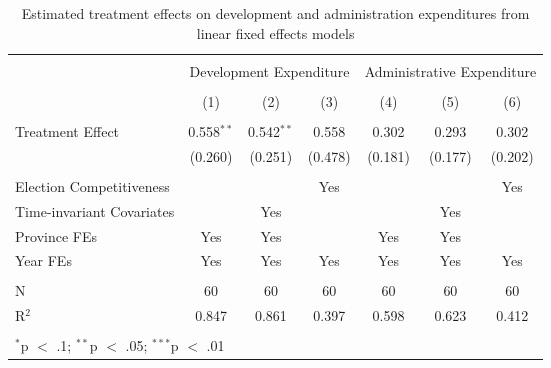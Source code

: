 
\begin{table}[!htbp] \centering 
  \caption{Estimated treatment effects on development and administration expenditures from linear fixed effects models} 
  \label{tab:lfe_mech} 
\begin{tabular}{@{\extracolsep{5pt}}lcccccc} 
\\[-1.8ex]\hline 
\hline \\[-1.8ex] 
 & \multicolumn{3}{c}{Development Expenditure} & \multicolumn{3}{c}{Administrative Expenditure} \\ 
\\[-1.8ex] & (1) & (2) & (3) & (4) & (5) & (6)\\ 
\hline \\[-1.8ex] 
 Treatment Effect & 0.558$^{**}$ & 0.542$^{**}$ & 0.558 & 0.302 & 0.293 & 0.302 \\ 
  & (0.260) & (0.251) & (0.478) & (0.181) & (0.177) & (0.202) \\ 
 \hline \\[-1.8ex] 
Election Competitiveness &  &  & Yes &  &  & Yes \\ 
Time-invariant Covariates &  & Yes &  &  & Yes &  \\ 
Province FEs & Yes & Yes &  & Yes & Yes &  \\ 
Year FEs & Yes & Yes & Yes & Yes & Yes & Yes \\ 
\hline \\[-1.8ex] 
N & 60 & 60 & 60 & 60 & 60 & 60 \\ 
R$^{2}$ & 0.847 & 0.861 & 0.397 & 0.598 & 0.623 & 0.412 \\ 
\hline 
\hline \\[-1.8ex] 
\multicolumn{7}{l}{$^{*}$p $<$ .1; $^{**}$p $<$ .05; $^{***}$p $<$ .01} \\ 
\end{tabular} 
\end{table} 
